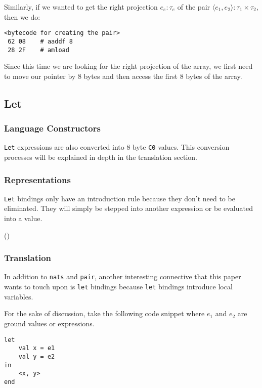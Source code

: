 \documentclass{acm_proc_article-sp}
\newcommand{\m}[1]{\texttt{#1}}
\begin{document}
Similarly, if we wanted to get the right projection $e_e : \tau_e$ of the pair $\langle e_1, e_2\rangle : \tau_1 \times \tau_2$, then we do:

\begin{verbatim}
<bytecode for creating the pair>
 62 08    # aaddf 8     
 28 2F    # amload  
\end{verbatim}

Since this time we are looking for the right projection of the array, we first need to move our pointer by 8 bytes and then access the first 8 bytes of the array.

\subsection{Let}
\subsubsection{Language Constructors}
\m{Let} expressions are also converted into 8 byte \m{C0} values. This conversion processes will be explained in depth in the translation section.
\subsubsection{Representations}
\m{Let} bindings only have an introduction rule because they don't need to be eliminated. They will simply be stepped into another expression or be evaluated into a value.

\begin{mathpar}
 ()
\end{mathpar}

\subsubsection{Translation}
In addition to \m{nats} and \m{pair}, another interesting connective that this paper wants to touch upon is \m{let} bindings because \m{let} bindings introduce local variables.

For the sake of discussion, take the following code snippet where $e_1$ and $e_2$ are ground values or expressions.
\begin{verbatim}
let
    val x = e1
    val y = e2
in
    <x, y>
end
\end{verbatim}
\end{document}
